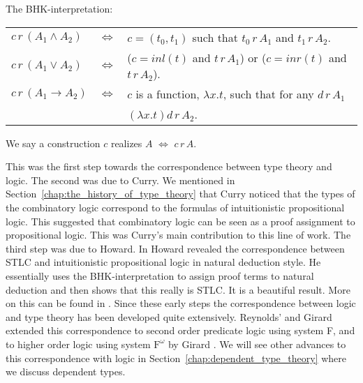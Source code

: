 \begin{definition}
  \label{def:bhk-interpretation}
  The BHK-interpretation:\\
  \begin{center}
          \begin{tabular}{lll}
      $c\,r\,(A_1 \land A_2)$ & $\iff$ & $c = (t_0,t_1)$ such that $t_0\,r\,A_1$ and 
            $t_1\,r\,A_2$.\\
      $c\,r\,(A_1 \lor A_2)$  & $\iff$ & ($c = inl(t)$ and $t\,r\,A_1$) or ($c = inr(t)$ and 
            $t\,r\,A_2$).\\
      $c\,r\,(A_1 \to A_2)$   & $\iff$ & $c$ is a function, $\lambda x.t$, such that for any 
            $d\,r\,A_1$ \\
                              &     & $(\lambda x.t)d\,r\,A_2$.
    \end{tabular}
  \end{center}
  We say a construction $c$ realizes $A$ $\iff$ $c\,r\,A$.  
\end{definition}
This was the first step towards the correspondence between type theory
and logic.  The second was due to Curry.  We mentioned in
Section~\ref{chap:the_history_of_type_theory} that Curry noticed that the
types of the combinatory logic correspond to the formulas of
intuitionistic propositional logic.  This suggested that combinatory
logic can be seen as a proof assignment to propositional logic.  This
was Curry's main contribution to this line of work.  The third step
was due to Howard.  In \cite{Howard:1980} Howard revealed the
correspondence between STLC and intuitionistic propositional logic in
natural deduction style.  He essentially uses the BHK-interpretation
to assign proof terms to natural deduction and then shows that this
really is STLC.  It is a beautiful result.  More on this can be found
in
\cite{Griffin:1990,Howard:1980,Mints:2000,Murthy:1991,Sorensen:2006,Troelstra:1991}.
Since these early steps the correspondence between logic and type
theory has been developed quite extensively.  Reynolds' and Girard
extended this correspondence to second order predicate logic using
system F, and to higher order logic using system $\text{F}^\omega$ by
Girard \cite{Wadler:2007,Girard:1971}.  We will see other advances to this
correspondence with logic in Section~\ref{chap:dependent_type_theory} where
we discuss dependent types.

